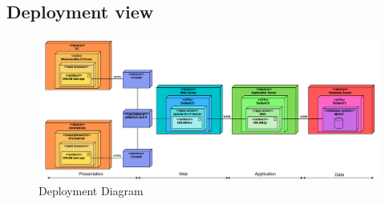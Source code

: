 \documentclass[table, 12pt]{article}
\begin{document}
\newpage
\subsection{Deployment view}
\begin{center}
    \begin{figure}[H]
        \includegraphics[scale=0.45, center]{assets/deployment_diagram.png}
        \caption{Deployment Diagram}
        \label{fig: deployment_diagram}
    \end{figure}
\end{center}
\end{document}

